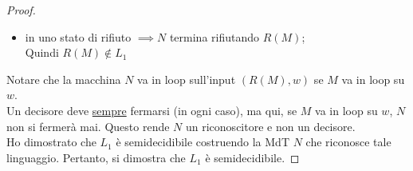 \documentclass{article}  %
\theoremstyle{definition}
\begin{document}
\begin{esercizio}[Esercizio 2.1]
\begin{proof}
\begin{enumerate}
\begin{itemize}
				      \item in uno stato di rifiuto $\implies N$ termina rifiutando $R(M)$; \\ Quindi $R(M) \notin L_1$
			      \end{itemize}
		\end{enumerate}
		Notare che la macchina $N$ va in loop sull'input $(R(M),w)$ se $M$ va in loop su $w$. \\
		Un decisore deve \underline{sempre} fermarsi (in ogni caso), ma qui, se $M$ va in loop su $w$, $N$ non si fermerà mai.
		Questo rende $N$ un riconoscitore e non un decisore. \\
		Ho dimostrato che $L_1$ è semidecidibile costruendo la MdT $N$ che riconosce tale linguaggio.
		Pertanto, si dimostra che $L_1$ è semidecidibile.
	\end{proof}
\end{esercizio}
\end{document}

